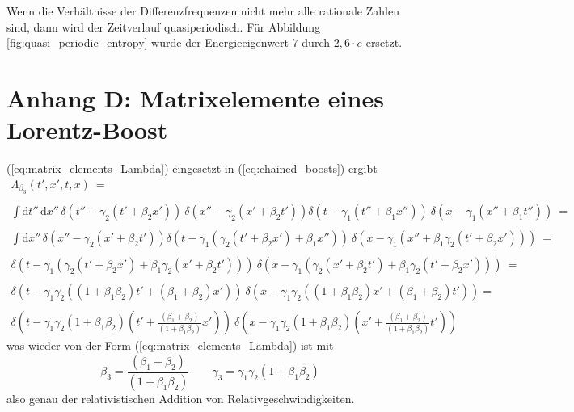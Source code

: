 \documentclass[12pt]{article}
\begin{document}
Wenn die Verhältnisse der Differenzfrequenzen nicht mehr alle rationale Zahlen sind, dann wird der Zeitverlauf quasiperiodisch. Für Abbildung \ref{fig:quasi_periodic_entropy} wurde der Energieeigenwert $7$ durch $2,6 \cdot e$ ersetzt.

\section{Anhang D: Matrixelemente eines Lorentz-Boost}

(\ref{eq:matrix_elements_Lambda}) eingesetzt in (\ref{eq:chained_boosts}) ergibt
\begin{equation*}
\begin{gathered}
\Lambda_{\beta_3}(t',x',t,x)\ = 
\\ \\
\int \mathrm{d}t''\,\mathrm{d}x''\,
\delta(t''-\gamma_2(t'+\beta_2 x'))\ \delta(x''-\gamma_2(x'+\beta_2 t'))
\delta(t-\gamma_1(t''+\beta_1 x''))\ \delta(x-\gamma_1(x''+\beta_1 t''))\ =
\\ \\
\int \mathrm{d}x''\,
\delta(x''-\gamma_2(x'+\beta_2 t'))
\delta(t-\gamma_1(\gamma_2(t'+\beta_2 x')+\beta_1 x''))\ \delta(x-\gamma_1(x''+\beta_1 \gamma_2(t'+\beta_2 x')))\ =
\\ \\
\delta(t-\gamma_1(\gamma_2(t'+\beta_2 x')+\beta_1 \gamma_2(x'+\beta_2 t')))\ \delta(x-\gamma_1(\gamma_2(x'+\beta_2 t')+\beta_1 \gamma_2(t'+\beta_2 x')))\ =
\\ \\
\delta(t-\gamma_1\gamma_2((1+\beta_1\beta_2)t'+(\beta_1+\beta_2)x'))\ 
\delta(x-\gamma_1\gamma_2((1+\beta_1\beta_2)x'+(\beta_1+\beta_2)t'))
=
\\ \\
\delta\left(t-\gamma_1\gamma_2(1+\beta_1\beta_2)(t'+\frac{(\beta_1+\beta_2)}{(1+\beta_1\beta_2)}x')\right)\ 
\delta\left(x-\gamma_1\gamma_2(1+\beta_1\beta_2)(x'+\frac{(\beta_1+\beta_2)}{(1+\beta_1\beta_2)}t')\right)
\end{gathered}
\end{equation*}
was wieder von der Form (\ref{eq:matrix_elements_Lambda}) ist mit
\begin{equation*}
\beta_3 = \frac{(\beta_1+\beta_2)}{(1+\beta_1\beta_2)} \quad \quad
\gamma_3 = \gamma_1 \gamma_2(1+\beta_1\beta_2) 
\end{equation*}
also genau der relativistischen Addition von Relativgeschwindigkeiten.

\newpage
\end{document}
